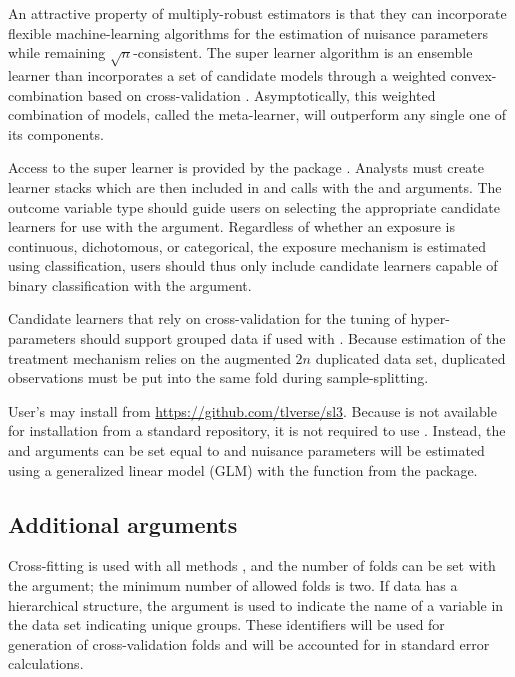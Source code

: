 \documentclass[]{jss}
\begin{document}
An attractive property of multiply-robust estimators is that they can
incorporate flexible machine-learning algorithms for the estimation of
nuisance parameters while remaining \(\sqrt{n}\)-consistent. The super
learner algorithm is an ensemble learner than incorporates a set of
candidate models through a weighted convex-combination based on
cross-validation \citep{laanSuperLearner2007}. Asymptotically, this
weighted combination of models, called the meta-learner, will outperform
any single one of its components.

Access to the super learner is provided by the  package \citep{coyleSl3}. Analysts must create  learner stacks which
are then included in  and  calls with the  and
 arguments. The outcome variable type should guide
users on selecting the appropriate candidate learners for use with the
 argument. Regardless of whether an exposure is
continuous, dichotomous, or categorical, the exposure mechanism is
estimated using classification, users should thus only include candidate
learners capable of binary classification with the 
argument.

Candidate learners that rely on cross-validation
for the tuning of hyper-parameters should support grouped data if used with . Because
estimation of the treatment mechanism relies on the augmented \(2n\) duplicated
data set, duplicated observations must be put into the same fold during sample-splitting. 

User's may install  from \url{https://github.com/tlverse/sl3}.
Because  is not available for installation from a standard
repository, it is not required to use . Instead, the  and 
 arguments can be set equal to
 and nuisance parameters will be estimated using a
generalized linear model (GLM) with the  function from the
 package.

\hypertarget{additional-arguments}{%
\subsection{Additional arguments}\label{additional-arguments}}

Cross-fitting is used with all methods \citep{zhengCrossValidatedTargetedMinimumLossBased2011b, chernozhukovDoubleDebiasedMachine2018}, and the number
of folds can be set with the  argument; the minimum number of allowed folds is two.
If data has a hierarchical structure, the  argument is used to indicate the name of a variable
in the data set indicating unique groups. These identifiers will be used for generation of cross-validation 
folds and will be accounted for in standard error calculations.
\end{document}
